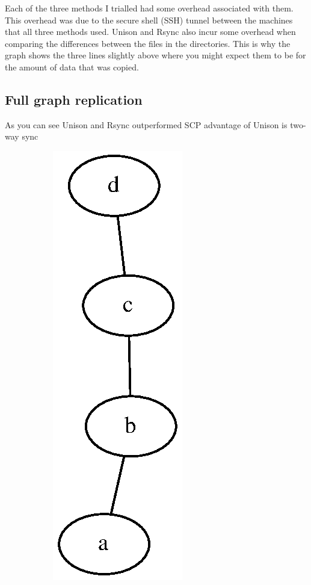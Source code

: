 \documentclass[12pt]{article}
\begin{document}
Each of the three methods I trialled had some overhead associated
with them. This overhead was due to the secure shell (SSH) tunnel between
the machines that all three methods used. Unison and Rsync also
incur some overhead when comparing the differences between the files
in the directories. This is why the graph shows the three lines
slightly above where you might expect them to be for the amount
of data that was copied.

\subsection{Full graph replication}
As you can see Unison and Rsync outperformed SCP
advantage of Unison is two-way sync
\begin{figure}[htp]
    \begin{subfigure}[b]{0.5\linewidth}
        \centering
        \includegraphics[scale=0.5]{images/line-graph.eps}

\end{subfigure}
\end{figure}
\end{document}
